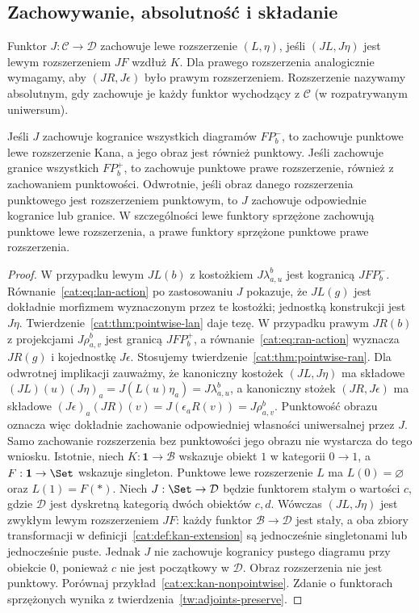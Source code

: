 \subsection{Zachowywanie, absolutność i składanie}
\begin{definicja}\label{cat:def:kan-preserved}
Funktor $J:\mathcal C\to\mathcal D$ zachowuje lewe rozszerzenie $(L,\eta)$, jeśli $(JL,J\eta)$ jest lewym rozszerzeniem $JF$ wzdłuż $K$. Dla prawego rozszerzenia analogicznie wymagamy, aby $(JR,J\epsilon)$ było prawym rozszerzeniem. Rozszerzenie nazywamy absolutnym, gdy zachowuje je każdy funktor wychodzący z $\mathcal C$ (w rozpatrywanym uniwersum).
\end{definicja}
\begin{stwierdzenie}\label{cat:prop:kan-preservation}
Jeśli $J$ zachowuje kogranice wszystkich diagramów $FP_b^-$, to zachowuje punktowe lewe rozszerzenie Kana, a jego obraz jest również punktowy. Jeśli zachowuje granice wszystkich $FP_b^+$, to zachowuje punktowe prawe rozszerzenie, również z zachowaniem punktowości. Odwrotnie, jeśli obraz danego rozszerzenia punktowego jest rozszerzeniem punktowym, to $J$ zachowuje odpowiednie kogranice lub granice. W szczególności lewe funktory sprzężone zachowują punktowe lewe rozszerzenia, a prawe funktory sprzężone punktowe prawe rozszerzenia.
\end{stwierdzenie}
\begin{proof}
W przypadku lewym $JL(b)$ z kostożkiem $J\lambda^b_{a,u}$ jest kogranicą $JFP_b^-$. Równanie~\eqref{cat:eq:lan-action} po zastosowaniu $J$ pokazuje, że $JL(g)$ jest dokładnie morfizmem wyznaczonym przez te kostożki; jednostką konstrukcji jest $J\eta$. Twierdzenie~\ref{cat:thm:pointwise-lan} daje tezę. W przypadku prawym $JR(b)$ z projekcjami $J\rho^b_{a,v}$ jest granicą $JFP_b^+$, a równanie~\eqref{cat:eq:ran-action} wyznacza $JR(g)$ i kojednostkę $J\epsilon$. Stosujemy twierdzenie~\ref{cat:thm:pointwise-ran}. Dla odwrotnej implikacji zauważmy, że kanoniczny kostożek $(JL,J\eta)$ ma składowe $(JL)(u)(J\eta)_a=J(L(u)\eta_a)=J\lambda^b_{a,u}$, a kanoniczny stożek $(JR,J\epsilon)$ ma składowe $(J\epsilon)_a(JR)(v)=J(\epsilon_a R(v))=J\rho^b_{a,v}$. Punktowość obrazu oznacza więc dokładnie zachowanie odpowiedniej własności uniwersalnej przez $J$. Samo zachowanie rozszerzenia bez punktowości jego obrazu nie wystarcza do tego wniosku. Istotnie, niech $K:\mathbf1\to\mathcal B$ wskazuje obiekt $1$ w kategorii $0\to1$, a $F:\mathbf1\to\Set$ wskazuje singleton. Punktowe lewe rozszerzenie $L$ ma $L(0)=\varnothing$ oraz $L(1)=F(*)$. Niech $J:\Set\to\mathcal D$ będzie funktorem stałym o wartości $c$, gdzie $\mathcal D$ jest dyskretną kategorią dwóch obiektów $c,d$. Wówczas $(JL,J\eta)$ jest zwykłym lewym rozszerzeniem $JF$: każdy funktor $\mathcal B\to\mathcal D$ jest stały, a oba zbiory transformacji w definicji~\ref{cat:def:kan-extension} są jednocześnie singletonami lub jednocześnie puste. Jednak $J$ nie zachowuje kogranicy pustego diagramu przy obiekcie $0$, ponieważ $c$ nie jest początkowy w $\mathcal D$. Obraz rozszerzenia nie jest punktowy. Porównaj przykład~\ref{cat:ex:kan-nonpointwise}. Zdanie o funktorach sprzężonych wynika z twierdzenia~\ref{tw:adjoints-preserve}.
\end{proof}
